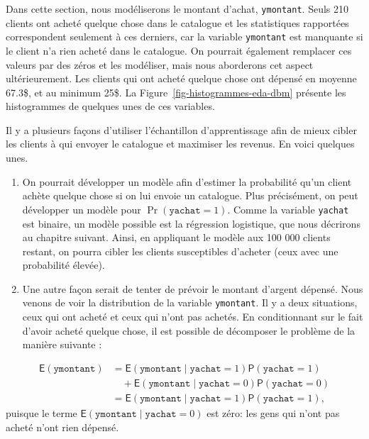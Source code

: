 \documentclass[
  11pt,
  letterpaper,
]{scrbook}
\providecommand{\tightlist}{%
  \setlength{\itemsep}{0pt}\setlength{\parskip}{0pt}}\usepackage{longtable,booktabs,array}
\theoremstyle{definition}
\theoremstyle{remark}
\begin{document}
Dans cette section, nous modéliserons le montant d'achat,
\texttt{ymontant}. Seuls 210 clients ont acheté quelque chose dans le
catalogue et les statistiques rapportées correspondent seulement à ces
derniers, car la variable \texttt{ymontant} est manquante si le client
n'a rien acheté dans le catalogue. On pourrait également remplacer ces
valeurs par des zéros et les modéliser, mais nous aborderons cet aspect
ultérieurement. Les clients qui ont acheté quelque chose ont dépensé en
moyenne 67.3\$, et au minimum 25\$. La
Figure~\ref{fig-histogrammes-eda-dbm} présente les histogrammes de
quelques unes de ces variables.

Il y a plusieurs façons d'utiliser l'échantillon d'apprentissage afin de
mieux cibler les clients à qui envoyer le catalogue et maximiser les
revenus. En voici quelques unes.

\begin{enumerate}
\def\labelenumi{\alph{enumi})}
\tightlist
\item
  On pourrait développer un modèle afin d'estimer la probabilité qu'un
  client achète quelque chose si on lui envoie un catalogue. Plus
  précisément, on peut développer un modèle pour
  \(\Pr(\texttt{yachat}=1)\). Comme la variable \texttt{yachat} est
  binaire, un modèle possible est la régression logistique, que nous
  décrirons au chapitre suivant. Ainsi, en appliquant le modèle aux 100
  000 clients restant, on pourra cibler les clients susceptibles
  d'acheter (ceux avec une probabilité élevée).
\item
  Une autre façon serait de tenter de prévoir le montant d'argent
  dépensé. Nous venons de voir la distribution de la variable
  \texttt{ymontant}. Il y a deux situations, ceux qui ont acheté et ceux
  qui n'ont pas achetés. En conditionnant sur le fait d'avoir acheté
  quelque chose, il est possible de décomposer le problème de la manière
  suivante :
\end{enumerate}

\begin{align*}
\mathsf{E}(\texttt{ymontant}) &= \mathsf{E}(\texttt{ymontant} \mid \texttt{yachat}=1) \mathsf{P}(\texttt{yachat}=1) \\& \quad + 
\mathsf{E}(\texttt{ymontant} \mid \texttt{yachat}=0) \mathsf{P}(\texttt{yachat}=0) \\
 &= \mathsf{E}(\texttt{ymontant} \mid \texttt{yachat}=1) \mathsf{P}(\texttt{yachat}=1),
\end{align*} puisque le terme
\(\mathsf{E}(\texttt{ymontant} \mid \texttt{yachat}=0)\) est zéro: les
gens qui n'ont pas acheté n'ont rien dépensé.
\end{document}
